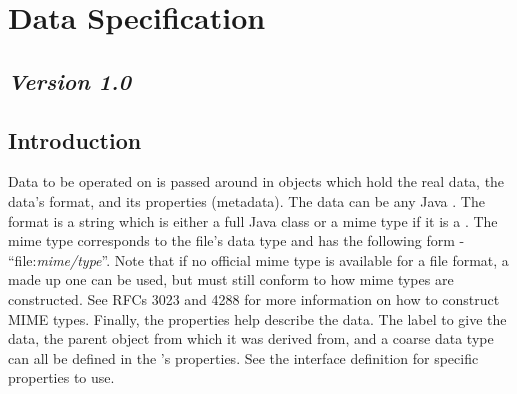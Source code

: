 \section{Data Specification}
\label{dataSpec}
\subsection*{\textit{Version 1.0}}
\subsection{Introduction}

Data to be operated on is passed around in  objects which hold the
real data, the data's format, and its properties (metadata). The data can be any
Java . The format is a string which is either a full Java class or
a mime type if it is a . The mime type corresponds to the
file's data type and has the following form - ``file:\textit{mime/type}''. Note
that if no official mime type is available for a file format, a made up one can
be used, but must still conform to how mime types are constructed. See RFCs 3023
and 4288 for more information on how to construct MIME types. Finally, the
properties help describe the data. The label to give the data, the parent
 object from which it was derived from, and a coarse data type can
all be defined in the 's properties. See the 
interface definition for specific properties to use.
